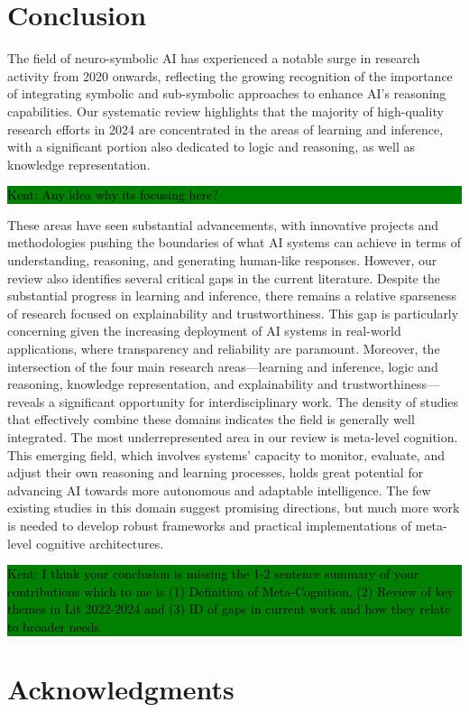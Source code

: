 \documentclass[hf]{ceurart}
\newcommand{\pinaforecomment}[4]{\colorbox{#1}{\textcolor{#4}{\parbox{.8\linewidth}{#2: #3}}}}
\newcommand{\osullikomment}[1]{\pinaforecomment{green}{Kent}{#1}{black}}
\begin{document}
\section{Conclusion}\label{sec:conclusion}
The field of neuro-symbolic AI has experienced a notable surge in research activity from 2020 onwards, reflecting the growing recognition of the importance of integrating symbolic and sub-symbolic approaches to enhance AI's reasoning capabilities. Our systematic review highlights that the majority of high-quality research efforts in 2024 are concentrated in the areas of learning and inference, with a significant portion also dedicated to logic and reasoning, as well as knowledge representation. 
%
\osullikomment{Any idea why its focusing here?}
%
These areas have seen substantial advancements, with innovative projects and methodologies pushing the boundaries of what AI systems can achieve in terms of understanding, reasoning, and generating human-like responses. However, our review also identifies several critical gaps in the current literature. Despite the substantial progress in learning and inference, there remains a relative sparseness of research focused on explainability and trustworthiness. This gap is particularly concerning given the increasing deployment of AI systems in real-world applications, where transparency and reliability are paramount. Moreover, the intersection of the four main research areas—learning and inference, logic and reasoning, knowledge representation, and explainability and trustworthiness—reveals a significant opportunity for interdisciplinary work. The density of studies that effectively combine these domains indicates the field is generally well integrated. The most underrepresented area in our review is meta-level cognition. This emerging field, which involves systems' capacity to monitor, evaluate, and adjust their own reasoning and learning processes, holds great potential for advancing AI towards more autonomous and adaptable intelligence. The few existing studies in this domain suggest promising directions, but much more work is needed to develop robust frameworks and practical implementations of meta-level cognitive architectures.

\osullikomment{I think your conclusion is missing the 1-2 sentence summary of your contributions which to me is (1) Definition of Meta-Cognition, (2) Review of key themes in Lit 2022-2024 and (3) ID of gaps in current work and how they relate to broader needs.}

\section{Acknowledgments}




\appendix
\end{document}
